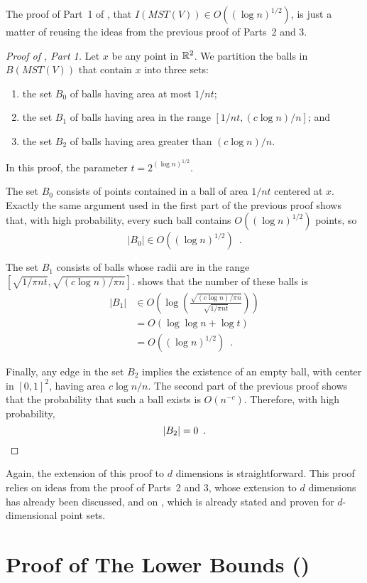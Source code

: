 \documentclass{patmorin}
\newcommand{\mst}{\mathit{MST}}
\begin{document}
The proof of Part~1 of , that $I(\mst(V))\in O((\log
n)^{1/2})$, is just a matter of reusing the ideas from the previous
proof of Parts~2 and 3.

\begin{proof}[Proof of , Part 1]
Let $x$ be any point in $\mathbb{R}^2$.  We partition the balls in $B(\mst(V))$
that contain $x$ into three sets:
\begin{enumerate}
  \item the set $B_0$ of balls having area at most $1/nt$;
  \item the set $B_1$ of balls having area in the range $[1/nt,(c\log
  n)/n]$; and
  \item the set $B_2$ of balls having area greater than $(c\log n)/n$.
\end{enumerate}
In this proof, the parameter $t=2^{(\log n)^{1/2}}$.

The set $B_0$ consists of points contained in a ball of area $1/nt$
centered at $x$.  Exactly the same argument used in the first part of
the previous proof shows that, with high probability, every such ball contains
$O((\log n)^{1/2})$ points, so
\[
     |B_0| \in O((\log n)^{1/2}) \enspace .
\]

The set $B_1$ consists of balls whose radii are in the range $[\sqrt{1/\pi
nt},\sqrt{(c\log n)/\pi n}]$.   shows that the number of
these balls is
\begin{align*}
    |B_1| & \in O\left(\log\left(\frac{\sqrt{(c\log n)/\pi n}}{\sqrt{1/\pi nt}}\right)\right) \\
    & = O(\log\log n + \log t) \\
    & = O((\log n)^{1/2}) \enspace .
\end{align*}

Finally, any edge in the set $B_2$ implies the existence of an empty ball,
with center in $[0,1]^2$, having area $c\log n/n$.  The second part of the
previous proof shows that the probability that such a ball exists is
$O(n^{-c})$.  Therefore, with high probability,
\[
   |B_2| = 0 \enspace . \qedhere
\]
\end{proof}

Again, the extension of this proof to $d$ dimensions is straightforward.
This proof relies on ideas from the proof of Parts~2 and 3, whose
extension to $d$ dimensions has already been discussed, and on
, which is already stated and proven for $d$-dimensional
point sets.

\section{Proof of The Lower Bounds ()}
\end{document}

